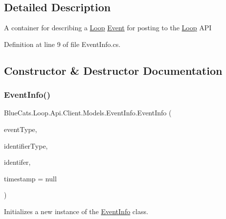 \subsection{Detailed Description}
A container for describing a \mbox{\hyperlink{namespace_blue_cats_1_1_loop}{Loop}} \mbox{\hyperlink{class_blue_cats_1_1_loop_1_1_api_1_1_client_1_1_models_1_1_event}{Event}} for posting to the \mbox{\hyperlink{namespace_blue_cats_1_1_loop}{Loop}} A\+PI 



Definition at line 9 of file Event\+Info.\+cs.



\subsection{Constructor \& Destructor Documentation}
\mbox{\label{class_blue_cats_1_1_loop_1_1_api_1_1_client_1_1_models_1_1_event_info_ad4fc925ea944b374f896aa176679d8b7}} 
\subsubsection{\texorpdfstring{Event\+Info()}{EventInfo()}\hspace{0.1cm}{\footnotesize\ttfamily [1/2]}}
{\footnotesize\ttfamily Blue\+Cats.\+Loop.\+Api.\+Client.\+Models.\+Event\+Info.\+Event\+Info (\begin{DoxyParamCaption}\item[{string}]{event\+Type,  }\item[{\mbox{\hyperlink{namespace_blue_cats_1_1_loop_1_1_api_1_1_client_1_1_models_a31a2ab154d0577f8b415d590bbee5d7c}{Event\+Identifier\+Type}}}]{identifier\+Type,  }\item[{string}]{identifer,  }\item[{Date\+Time?}]{timestamp = {\ttfamily null} }\end{DoxyParamCaption})\hspace{0.3cm}{\ttfamily [inline]}}



Initializes a new instance of the \mbox{\hyperlink{class_blue_cats_1_1_loop_1_1_api_1_1_client_1_1_models_1_1_event_info}{Event\+Info}} class. 


